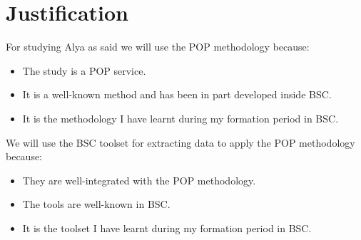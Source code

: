 \section{Justification}
\label{sec:justification}
\justify
For studying Alya as said we will use the POP methodology because:

\begin{itemize}
  \item The study is a POP service.
  \item It is a well-known method and has been in part developed inside BSC.
  \item It is the methodology I have learnt during my formation period in BSC.
\end{itemize}

\justify
We will use the BSC toolset for extracting data to apply the POP methodology because:

\begin{itemize}
  \item They are well-integrated with the POP methodology.
  \item The tools are well-known in BSC.
  \item It is the toolset I have learnt during my formation period in BSC.
\end{itemize}

